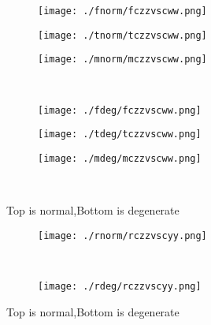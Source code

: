 \documentclass[aps,floats,floatfix,nofootinbib]{revtex4-1}
\begin{document}
\begin{center}
\begin{figure}
\begin{subfigure}{0.3\textwidth}
\texttt{[image: ./fnorm/fczzvscww.png]}
\label{}
\end{subfigure}
\begin{subfigure}{0.3\textwidth}
\texttt{[image: ./tnorm/tczzvscww.png]}
\label{}
\end{subfigure}
\begin{subfigure}{0.3\textwidth}
\texttt{[image: ./mnorm/mczzvscww.png]}
\label{}
\end{subfigure}\\
\begin{subfigure}{0.3\textwidth}
\texttt{[image: ./fdeg/fczzvscww.png]}
\label{}
\end{subfigure}
\begin{subfigure}{0.3\textwidth}
\texttt{[image: ./tdeg/tczzvscww.png]}
\label{}
\end{subfigure}
\begin{subfigure}{0.3\textwidth}
\texttt{[image: ./mdeg/mczzvscww.png]}
\label{}
\end{subfigure}\\
\caption{Top is normal,Bottom is degenerate}
\end{figure}
\end{center}

\begin{center}
\begin{figure}
\begin{subfigure}{0.95\textwidth}
\texttt{[image: ./rnorm/rczzvscyy.png]}
\label{}
\end{subfigure}\\
\begin{subfigure}{0.95\textwidth}
\texttt{[image: ./rdeg/rczzvscyy.png]}
\label{}
\end{subfigure}
\caption{Top is normal,Bottom is degenerate}
\end{figure}
\end{center}
\end{document}
